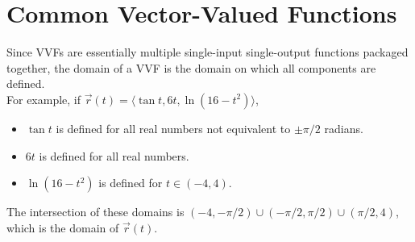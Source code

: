 \section{Common Vector-Valued Functions}



\noindent
Since VVFs are essentially multiple single-input single-output functions packaged together, the domain of a VVF is the domain on which all components are defined.\\

\noindent
For example, if $\vec{r}(t) = \langle \tan{t},6t,\ln{\left(16-t^2\right)} \rangle$,
\begin{itemize}
	\item $\tan{t}$ is defined for all real numbers not equivalent to $\pm\pi/2$ radians.
	\item $6t$ is defined for all real numbers.
	\item $\ln{\left(16-t^2\right)}$ is defined for $t\in\left(-4,4\right)$.
\end{itemize}
The intersection of these domains is $\left(-4, -\pi/2\right) \cup \left(-\pi/2, \pi/2\right) \cup \left(\pi/2, 4\right)$, which is the domain of $\vec{r}(t)$.